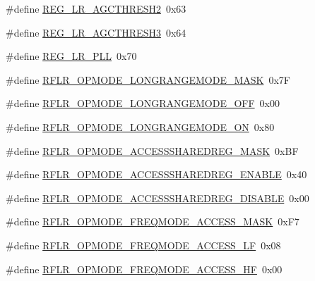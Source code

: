 \begin{DoxyCompactItemize}
\item 
\#define \hyperlink{sx1276Regs-LoRa_8h_a58a2478774db4cf2ff4bdc89c7f29eff}{R\+E\+G\+\_\+\+L\+R\+\_\+\+A\+G\+C\+T\+H\+R\+E\+S\+H2}~0x63
\item 
\#define \hyperlink{sx1276Regs-LoRa_8h_a546cd6aa87137c48b5c98c5973f6f8de}{R\+E\+G\+\_\+\+L\+R\+\_\+\+A\+G\+C\+T\+H\+R\+E\+S\+H3}~0x64
\item 
\#define \hyperlink{sx1276Regs-LoRa_8h_a59ec52cf30ae082fee02bdf04a95dcf8}{R\+E\+G\+\_\+\+L\+R\+\_\+\+P\+LL}~0x70
\item 
\#define \hyperlink{sx1276Regs-LoRa_8h_a4f5c6acc1ecbded1e724e4d8d4614a4d}{R\+F\+L\+R\+\_\+\+O\+P\+M\+O\+D\+E\+\_\+\+L\+O\+N\+G\+R\+A\+N\+G\+E\+M\+O\+D\+E\+\_\+\+M\+A\+SK}~0x7F
\item 
\#define \hyperlink{sx1276Regs-LoRa_8h_abb6cc4dc044295367651d11fb77508bd}{R\+F\+L\+R\+\_\+\+O\+P\+M\+O\+D\+E\+\_\+\+L\+O\+N\+G\+R\+A\+N\+G\+E\+M\+O\+D\+E\+\_\+\+O\+FF}~0x00
\item 
\#define \hyperlink{sx1276Regs-LoRa_8h_a4d9b59767f3e421ed4b6a5857c1007bf}{R\+F\+L\+R\+\_\+\+O\+P\+M\+O\+D\+E\+\_\+\+L\+O\+N\+G\+R\+A\+N\+G\+E\+M\+O\+D\+E\+\_\+\+ON}~0x80
\item 
\#define \hyperlink{sx1276Regs-LoRa_8h_a01598cd825d7b0a773e420ba4811067c}{R\+F\+L\+R\+\_\+\+O\+P\+M\+O\+D\+E\+\_\+\+A\+C\+C\+E\+S\+S\+S\+H\+A\+R\+E\+D\+R\+E\+G\+\_\+\+M\+A\+SK}~0x\+BF
\item 
\#define \hyperlink{sx1276Regs-LoRa_8h_a32305e7842ed6a5e27dea62504bb59da}{R\+F\+L\+R\+\_\+\+O\+P\+M\+O\+D\+E\+\_\+\+A\+C\+C\+E\+S\+S\+S\+H\+A\+R\+E\+D\+R\+E\+G\+\_\+\+E\+N\+A\+B\+LE}~0x40
\item 
\#define \hyperlink{sx1276Regs-LoRa_8h_ad9b5fa39ecfbad14292001a38b5db44d}{R\+F\+L\+R\+\_\+\+O\+P\+M\+O\+D\+E\+\_\+\+A\+C\+C\+E\+S\+S\+S\+H\+A\+R\+E\+D\+R\+E\+G\+\_\+\+D\+I\+S\+A\+B\+LE}~0x00
\item 
\#define \hyperlink{sx1276Regs-LoRa_8h_af78146c81e7e2c1d15a3c1f487fc8237}{R\+F\+L\+R\+\_\+\+O\+P\+M\+O\+D\+E\+\_\+\+F\+R\+E\+Q\+M\+O\+D\+E\+\_\+\+A\+C\+C\+E\+S\+S\+\_\+\+M\+A\+SK}~0x\+F7
\item 
\#define \hyperlink{sx1276Regs-LoRa_8h_ac3b485df85439dc57b6ff9fa4b4e7178}{R\+F\+L\+R\+\_\+\+O\+P\+M\+O\+D\+E\+\_\+\+F\+R\+E\+Q\+M\+O\+D\+E\+\_\+\+A\+C\+C\+E\+S\+S\+\_\+\+LF}~0x08
\item 
\#define \hyperlink{sx1276Regs-LoRa_8h_aa8585403cacfc764a79455a2e82507bf}{R\+F\+L\+R\+\_\+\+O\+P\+M\+O\+D\+E\+\_\+\+F\+R\+E\+Q\+M\+O\+D\+E\+\_\+\+A\+C\+C\+E\+S\+S\+\_\+\+HF}~0x00
\item 

\end{DoxyCompactItemize}
